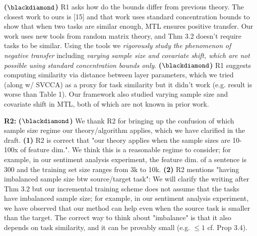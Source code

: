 \documentclass{article}
\begin{document}
\vspace{-0.045in}
\textbf{($\blackdiamond$)} R1 asks how do the bounds differ from previous theory. The closest work to ours is [15] and that work uses standard concentration bounds to show that when two tasks are similar enough, MTL ensures positive transfer.
Our work uses new tools from random matrix theory, and Thm 3.2 doesn't require tasks to be similar.
Using the tools we \textit{rigorously study the phenomenon of negative transfer} including \textit{varying sample size and covariate shift, which are not possible using standard concentration bounds only}.
\textbf{($\blackdiamond$)} R1 suggests computing similarity via distance between layer parameters,
which we tried (along w/ SVCCA) as a proxy for task similarity but it didn't work (e.g. result is worse than Table 1). Our framework also studied varying sample size and covariate shift in MTL, both of which are not known in prior work.
%

\vspace{-0.025in}
\textbf{R2:}
\textbf{($\blackdiamond$)} We thank R2 for bringing up the confusion of which sample size regime our theory/algorithm applies, which we have clarified in the draft.
\textbf{(1)} R2 is correct that "our theory applies when the sample sizes are 10-100x of feature dim.".
We think this is a reasonable regime to consider; for example, in our sentiment analysis experiment, the feature dim. of a sentence is 300 and the training set size ranges from 3k to 10k.
\textbf{(2)} R2 mentions "having imbalanced sample size btw source/target task": We will clarify the writing after Thm 3.2 but our incremental training scheme does not assume that the tasks have imbalanced sample size; for example, in our sentiment analysis experiment, we have observed that our method can help even when the source task is smaller than the target.
The correct way to think about "imbalance" is that it also depends on task similarity, and it can be provably small (e.g. $\le 1$ cf. Prop 3.4).
\end{document}
